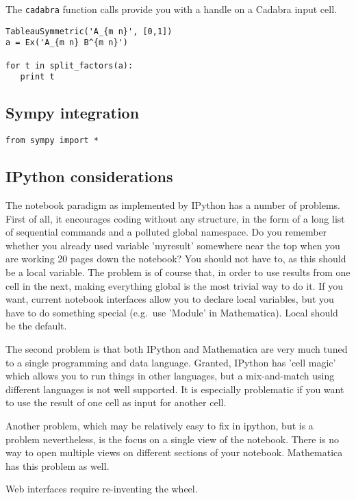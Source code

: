\documentclass[11pt]{article}
\begin{document}
The {\tt cadabra} function calls provide you with a handle on a
Cadabra input cell.

\begin{lstlisting}
TableauSymmetric('A_{m n}', [0,1])
a = Ex('A_{m n} B^{m n}')

for t in split_factors(a):
   print t   
\end{lstlisting}


\subsection{Sympy integration}

\begin{lstlisting}
from sympy import *
\end{lstlisting}


\subsection{IPython considerations}

The notebook paradigm as implemented by IPython has a number of
problems. First of all, it encourages coding without any structure, in
the form of a long list of sequential commands and a polluted global
namespace. Do you remember whether you already used variable
'myresult' somewhere near the top when you are working 20 pages down
the notebook? You should not have to, as this should be a local
variable. The problem is of course that, in order to use results from
one cell in the next, making everything global is the most trivial way
to do it. If you want, current notebook interfaces allow you to
declare local variables, but you have to do something special
(e.g.~use 'Module' in Mathematica). Local should be the default.

The second problem is that both IPython and Mathematica are very much
tuned to a single programming and data language. Granted, IPython has
'cell magic' which allows you to run things in other languages, but a
mix-and-match using different languages is not well supported. It is
especially problematic if you want to use the result of one cell as
input for another cell.

Another problem, which may be relatively easy to fix in ipython, but
is a problem nevertheless, is the focus on a single view of the
notebook. There is no way to open multiple views on different sections
of your notebook. Mathematica has this problem as well.

Web interfaces require re-inventing the wheel.
\end{document}
